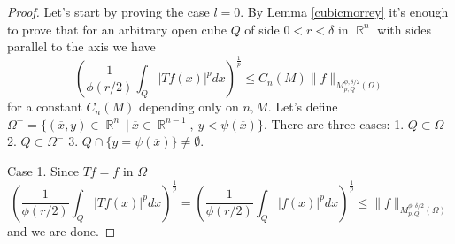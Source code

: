 \documentclass[12pt]{article}
\theoremstyle{definition}
\DeclareMathOperator\rr{\mathbb{R}}
\begin{document}
\begin{proof}
Let's start by proving the case $l=0$. By Lemma \ref{cubicmorrey} it's enough to prove that for an arbitrary open cube $Q$ of side $0<r<\delta$ in $\rr^n$ with sides parallel to the axis we have
\begin{equation}
\left(\frac{1}{\phi(r/2)}\int_Q |Tf(x)|^pdx \right)^{\frac{1}{p}} \le C_n(M) \| f\|_{M_{p,Q}^{\phi,\delta/2}(\Omega)} \label{cubestimate}
\end{equation}
for a constant $C_n(M)$ depending only on $n,M$. Let's define  $\Omega^- = \{ (\overline x , y) \in \rr^n \ | \ \overline x \in \rr^{n-1}, \ y<\psi(\overline x) \}$. There are three cases: 1. $Q \subset \Omega$ 2. $Q \subset \Omega^-$ 3. $Q\cap \{y=\psi(\overline x)\} \neq \emptyset.$ 

Case 1. Since $Tf=f$ in $\Omega$
\[ \left(\frac{1}{\phi(r/2)}\int_Q |Tf(x)|^pdx \right)^{\frac{1}{p}}=\left(\frac{1}{\phi(r/2)}\int_Q |f(x)|^pdx \right)^{\frac{1}{p}} \le  \| f\|_{M_{p,Q}^{\phi,\delta/2}(\Omega)}\]
and we are done.


\end{proof}
\end{document}
